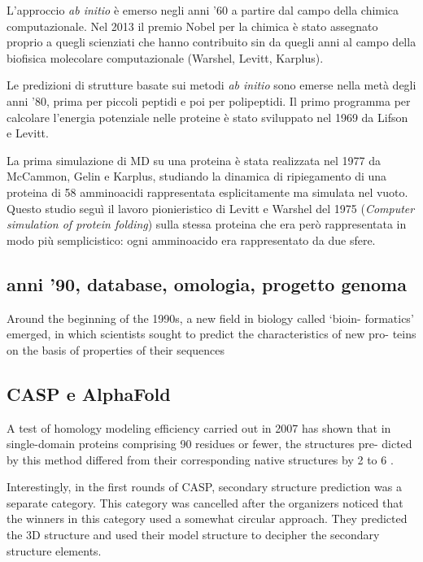 L'approccio \textit{ab initio} è emerso negli anni '60 a partire dal campo della chimica computazionale. Nel 2013 il premio Nobel per la chimica è stato assegnato proprio a quegli scienziati che hanno contribuito sin da quegli anni al campo della biofisica molecolare computazionale (Warshel, Levitt, Karplus).

\par Le predizioni di strutture basate sui metodi \textit{ab initio} sono emerse nella metà degli anni '80, prima per piccoli peptidi e poi per polipeptidi. Il primo programma per calcolare l'energia potenziale nelle proteine è stato sviluppato nel 1969 da Lifson e Levitt\supercite{levitt1969refinement}.

\par La prima simulazione di MD su una proteina è stata realizzata nel 1977 da McCammon, Gelin e Karplus\supercite{mccammon1977dynamics}, studiando la dinamica di ripiegamento di una proteina di 58 amminoacidi rappresentata esplicitamente ma simulata nel vuoto. Questo studio seguì il lavoro pionieristico di Levitt e Warshel del 1975 (\textit{Computer simulation of protein folding}\supercite{levitt1975computer}) sulla stessa proteina che era però rappresentata in modo più semplicistico: ogni amminoacido era rappresentato da due sfere. 



\subsection{anni '90, database, omologia, progetto genoma}

Around the beginning of the 1990s, a new field in biology called ‘bioin-
formatics’ emerged, in which scientists sought to predict the characteristics of new pro-
teins on the basis of properties of their sequences

\subsection{CASP e AlphaFold}

A test of homology modeling efficiency carried out in 2007 has
shown that in single-domain proteins comprising 90 residues or fewer, the structures pre-
dicted by this method differed from their corresponding native structures by 2 to 6 \supercite{dill2008protein}.



Interestingly, in the first rounds of CASP, secondary structure prediction was a separate category. This
category was cancelled after the organizers noticed that the winners in this category used a somewhat circular
approach. They predicted the 3D structure and used their model structure to decipher the secondary structure
elements.

\clearpage